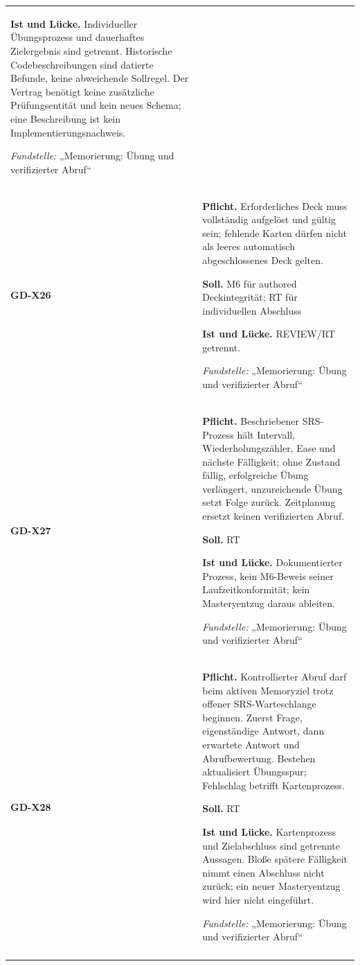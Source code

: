 \begin{longtable}{@{}P{20mm}P{128mm}@{}}
\textbf{Ist und Lücke.} Individueller Übungsprozess und dauerhaftes Zielergebnis sind getrennt. Historische Codebeschreibungen sind datierte Befunde, keine abweichende Sollregel. Der Vertrag benötigt keine zusätzliche Prüfungsentität und kein neues Schema; eine Beschreibung ist kein Implementierungsnachweis.\par\smallskip
\emph{Fundstelle:} „Memorierung: Übung und verifizierter Abruf“\\\addlinespace[5pt]
\label{rule:GD-X26}\textbf{GD-X26} &
\textbf{Pflicht.} Erforderliches Deck muss vollständig aufgelöst und gültig sein; fehlende Karten dürfen nicht als leeres automatisch abgeschlossenes Deck gelten.\par\smallskip
\textbf{Soll.} M6 für authored Deckintegrität; RT für individuellen Abschluss\par\smallskip
\textbf{Ist und Lücke.} REVIEW/RT getrennt.\par\smallskip
\emph{Fundstelle:} „Memorierung: Übung und verifizierter Abruf“\\\addlinespace[5pt]
\label{rule:GD-X27}\textbf{GD-X27} &
\textbf{Pflicht.} Beschriebener SRS-Prozess hält Intervall, Wiederholungszähler, Ease und nächste Fälligkeit; ohne Zustand fällig, erfolgreiche Übung verlängert, unzureichende Übung setzt Folge zurück. Zeitplanung ersetzt keinen verifizierten Abruf.\par\smallskip
\textbf{Soll.} RT\par\smallskip
\textbf{Ist und Lücke.} Dokumentierter Prozess, kein M6-Beweis seiner Laufzeitkonformität; kein Masteryentzug daraus ableiten.\par\smallskip
\emph{Fundstelle:} „Memorierung: Übung und verifizierter Abruf“\\\addlinespace[5pt]
\label{rule:GD-X28}\textbf{GD-X28} &
\textbf{Pflicht.} Kontrollierter Abruf darf beim aktiven Memoryziel trotz offener SRS-Warteschlange beginnen. Zuerst Frage, eigenständige Antwort, dann erwartete Antwort und Abrufbewertung. Bestehen aktualisiert Übungsspur; Fehlschlag betrifft Kartenprozess.\par\smallskip
\textbf{Soll.} RT\par\smallskip
\textbf{Ist und Lücke.} Kartenprozess und Zielabschluss sind getrennte Aussagen. Bloße spätere Fälligkeit nimmt einen Abschluss nicht zurück; ein neuer Masteryentzug wird hier nicht eingeführt.\par\smallskip
\emph{Fundstelle:} „Memorierung: Übung und verifizierter Abruf“\\\addlinespace[5pt]

\end{longtable}
